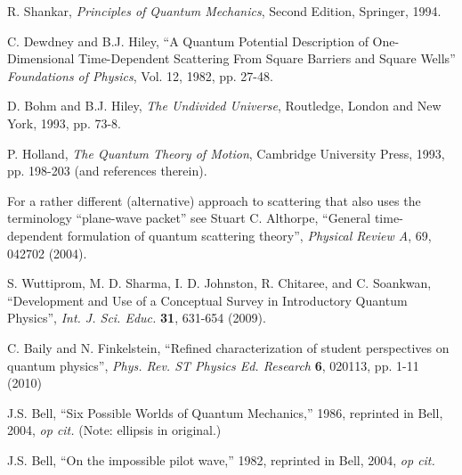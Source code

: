 \documentclass[aps,prc,twocolumn,letterpaper,floatfix]{revtex4}
\begin{document}
\begin{thebibliography}{99}
 R. Shankar, \emph{Principles of Quantum Mechanics},
  Second Edition, Springer, 1994.

 C. Dewdney and B.J. Hiley, ``A Quantum Potential
  Description of One-Dimensional Time-Dependent Scattering From Square
  Barriers and Square Wells'' \emph{Foundations of Physics}, Vol. 12,
  1982, pp. 27-48.  

 D. Bohm and B.J. Hiley, \emph{The Undivided Universe},
  Routledge, London and New York, 1993, pp. 73-8.

 P. Holland, \emph{The Quantum Theory of Motion},
  Cambridge University Press, 1993, pp. 198-203 (and references therein).


  For a rather different (alternative) approach to
  scattering that also uses the terminology ``plane-wave packet'' see
  Stuart C. Althorpe, ``General time-dependent formulation of quantum
  scattering theory'', \emph{Physical Review A}, 69, 042702 (2004).

 S. Wuttiprom, M. D. Sharma, I. D. Johnston, R. Chitaree, and C. Soankwan, ``Development and Use of a Conceptual Survey in Introductory Quantum Physics'', \emph{Int. J. Sci. Educ.} {\bf{31}}, 631-654 (2009).

 C. Baily and N. Finkelstein, ``Refined
  characterization of student perspectives on quantum physics'', 
\emph{Phys. Rev. ST Physics Ed. Research} {\bf{6}}, 020113, pp. 1-11 (2010)

 J.S. Bell, ``Six Possible Worlds of Quantum
  Mechanics,'' 1986, reprinted in Bell, 2004, \emph{op cit.}  (Note:
  ellipsis in original.)  

 J.S. Bell, ``On the impossible pilot wave,'' 1982,
  reprinted in Bell, 2004, \emph{op cit.}


\end{thebibliography}
\end{document}
